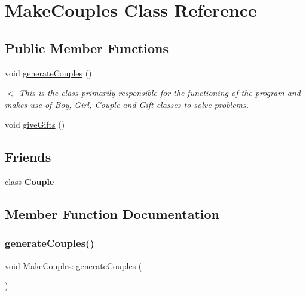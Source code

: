 \hypertarget{class_make_couples}{}\section{Make\+Couples Class Reference}
\label{class_make_couples}
\subsection*{Public Member Functions}
\begin{DoxyCompactItemize}
\item 
void \hyperlink{class_make_couples_ada939d38013b761a0745620ce2e57195}{generate\+Couples} ()
\begin{DoxyCompactList}\small\item\em $<$ This is the class primarily responsible for the functioning of the program and makes use of \hyperlink{class_boy}{Boy}, \hyperlink{class_girl}{Girl}, \hyperlink{class_couple}{Couple} and \hyperlink{class_gift}{Gift} classes to solve problems. \end{DoxyCompactList}\item 
void \hyperlink{class_make_couples_a55984a015f74fa6752dba1d9e014ba58}{give\+Gifts} ()
\end{DoxyCompactItemize}
\subsection*{Friends}
\begin{DoxyCompactItemize}
\item 
\mbox{\label{class_make_couples_a94ec3d69c6a9671cf7d5967498c81a90}} 
class {\bfseries Couple}
\end{DoxyCompactItemize}


\subsection{Member Function Documentation}
\mbox{\label{class_make_couples_ada939d38013b761a0745620ce2e57195}} 
\subsubsection{\texorpdfstring{generate\+Couples()}{generateCouples()}}
{\footnotesize\ttfamily void Make\+Couples\+::generate\+Couples (\begin{DoxyParamCaption}{ }\end{DoxyParamCaption})}



